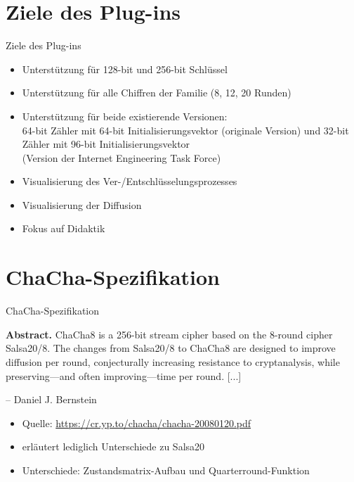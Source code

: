 \documentclass{beamer}
\begin{document}
\section{Ziele des Plug-ins}
\begin{frame}{Ziele des Plug-ins}
\begin{itemize}
\item Unterstützung für 128-bit und 256-bit Schlüssel
\item Unterstützung für alle Chiffren der Familie (8, 12, 20 Runden)
\item Unterstützung für beide existierende Versionen: \\64-bit Zähler mit 64-bit Initialisierungsvektor (originale Version) und 32-bit Zähler mit 96-bit Initialisierungsvektor \\(Version der Internet Engineering Task Force)
\item Visualisierung des Ver-/Entschlüsselungsprozesses
\item Visualisierung der Diffusion
\item Fokus auf Didaktik
\end{itemize}
\end{frame}

\section{ChaCha-Spezifikation}
\begin{frame}{ChaCha-Spezifikation}

\begin{center}
\parbox{0.8\textwidth}{
\textbf{Abstract.} ChaCha8 is a 256-bit stream cipher based on the 8-round
cipher Salsa20/8. The changes from Salsa20/8 to ChaCha8 are designed
to improve diffusion per round, conjecturally increasing resistance to
cryptanalysis, while preserving—and often improving—time per round. [...]
\vspace{-0.75em}
\begin{flushright}
-- Daniel J. Bernstein
\end{flushright}
}
\end{center}
\begin{itemize}
\item Quelle: \url{https://cr.yp.to/chacha/chacha-20080120.pdf}
\item erläutert lediglich Unterschiede zu Salsa20
\item Unterschiede: Zustandsmatrix-Aufbau und Quarterround-Funktion
\end{itemize}
\end{frame}
\end{document}
